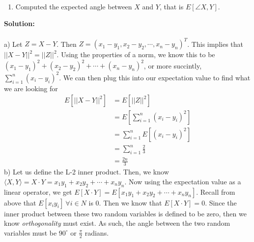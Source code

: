\documentclass[11pt]{article}
\begin{document}
\begin{enumerate}
\begin{enumerate}
		\item Computed the expected angle between $X$ and $Y$, that is $E[\angle X, Y]$.
	\end{enumerate}
	\textbf{Solution:} \\\\
	a) Let $Z = X-Y$. Then $Z = (x_1 - y_1, x_2 - y_2, \cdots, x_n - y_n)^T$. This implies that $||X-Y||^2 = ||Z||^2$. Using the properties of a norm, we know this to be $(x_1 - y_1)^2 + (x_2 - y_2)^2 + \cdots + (x_n - y_n)^2$, or more succintly, $\sum_{i = 1}^n(x_i - y_i)^2$.
	We can then plug this into our expectation value to find what we are looking for
	\begin{align*}
		E[||X-Y||^2] &= E[||Z||^2] \\
		&= E[\sum_{i = 1}^n(x_i - y_i)^2] \\
		&= \sum_{i = 1}^nE[(x_i - y_i)^2] \\
		&= \sum_{i = 1}^n \frac{2}{3} \\
		&= \frac{2n}{3}
	\end{align*}
	b) Let us define the L-2 inner product. Then, we know $\langle X,Y \rangle = X \cdot Y = x_1y_1 +x_2y_2 + \cdots + x_ny_n$. Now using the expectation value as a linear operator, we get $E[X \cdot Y] = E[x_1y_1 +x_2y_2 + \cdots + x_ny_n]$. Recall from above that $E[x_iy_i]~\forall i \in N$ is 0. 
	Then we know that $E[X\cdot Y] = 0$. Since the inner product between these two random variables is defined to be zero, then we know \textit{orthogonality} must exist. As such, the angle between the two random variables must be $90^\circ$ or $\frac{\pi}{2}$ radians.


\end{enumerate}
\end{document}

